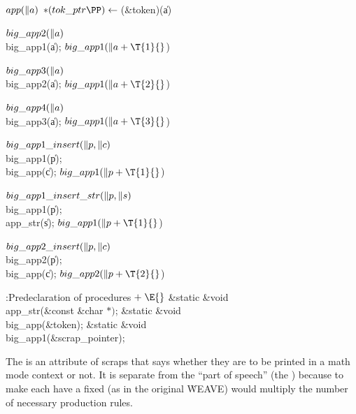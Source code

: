 \Y\B\4\D$\\{app}(\|a)$ \5
${*}(\\{tok\_ptr}\PP)\K{}$(\&{token})(\|a)\Y\par
\B\4\D$\\{big\_app2}(\|a)$ \5
\\{big\_app1}(\|a);\5
$\\{big\_app1}(\|a+\T{1}{}$)\par
\B\4\D$\\{big\_app3}(\|a)$ \5
\\{big\_app2}(\|a);\5
$\\{big\_app1}(\|a+\T{2}{}$)\par
\B\4\D$\\{big\_app4}(\|a)$ \5
\\{big\_app3}(\|a);\5
$\\{big\_app1}(\|a+\T{3}{}$)\Y\par
\B\4\D$\\{big\_app1\_insert}(\|p,\|c)$ \5
\\{big\_app1}(\|p);\5
\\{big\_app}(\|c);\5
$\\{big\_app1}(\|p+\T{1}{}$)\par
\B\4\D$\\{big\_app1\_insert\_str}(\|p,\|s)$ \5
\\{big\_app1}(\|p);\5
\\{app\_str}(\|s);\5
$\\{big\_app1}(\|p+\T{1}{}$)\par
\B\4\D$\\{big\_app2\_insert}(\|p,\|c)$ \5
\\{big\_app2}(\|p);\5
\\{big\_app}(\|c);\5
$\\{big\_app2}(\|p+\T{2}{}$)\par
\Y\B\4:Predeclaration of procedures\X${}\mathrel+\E{}$\6
\&{static} \&{void} \\{app\_str}(\&{const} \&{char} ${}{*}){}$;\6
\&{static} \&{void} \\{big\_app}(\&{token});\6
\&{static} \&{void} \\{big\_app1}(\&{scrap\_pointer});\par
\fi

The  is an attribute of scraps that says whether they
are
to be printed in a math mode context or not.  It is separate from the
``part of speech'' (the ) because to make each  have
a fixed  (as in the original \.{WEAVE}) would multiply the
number of necessary production rules.


